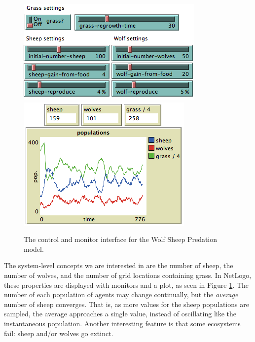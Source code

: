 \begin{figure}[ht]
\centering
\includegraphics[scale=.66667]{images/wolfsheepcontrols.png}
\includegraphics[scale=.66667]{images/wolfsheepmons.png}
\caption{The control and monitor interface for the Wolf Sheep Predation model.}
\label{fig:wolfsheepui}
\end{figure}

The system-level concepts we are interested in are the number of sheep, the number of wolves, and the number of grid locations containing grass.
In NetLogo, these properties are displayed with monitors and a plot, as seen in Figure \ref{fig:wolfsheepui}.
The number of each population of agents may change continually, but the \textit{average} number of sheep converges.
That is, as more values for the sheep populations are sampled, the average approaches a single value, instead of oscillating like the instantaneous population.
Another interesting feature is that some ecosystems fail: sheep and/or wolves go extinct.

